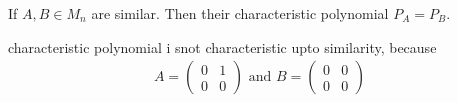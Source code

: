 \begin{theorem}
  If $A, B \in M_n$ are similar. Then their characteristic polynomial
  $P_A = P_B$.
\end{theorem}

\begin{remark}
  characteristic polynomial i snot characteristic upto similarity, because
  \begin{align*}
    A =
    \begin{pmatrix}%
      0 & 1 \\
      0 & 0
    \end{pmatrix} \text{ and } B =
    \begin{pmatrix}%
      0 & 0\\
      0 & 0
    \end{pmatrix}
  \end{align*}
\end{remark}
